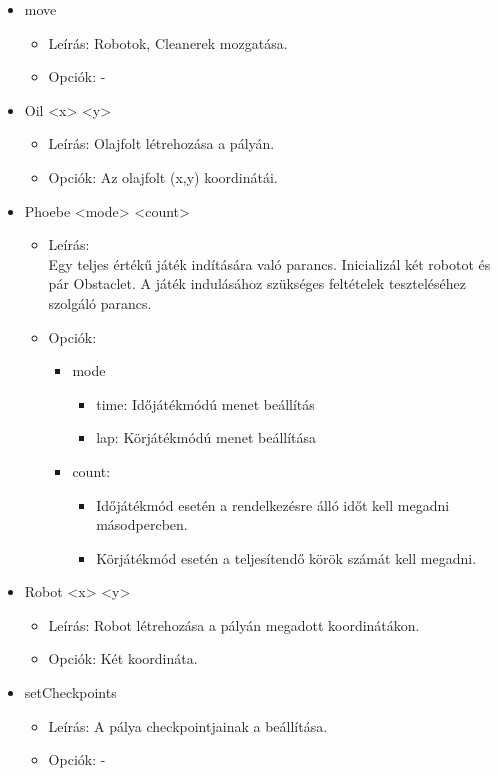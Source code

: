 \begin{itemize}
\item move
	\begin{itemize}
	\item Leírás: Robotok, Cleanerek mozgatása.
	\item Opciók: -
	\end{itemize}
	
\item Oil <x> <y>
	\begin{itemize}
	\item Leírás: Olajfolt létrehozása a pályán.
	\item Opciók: Az olajfolt (x,y) koordinátái.
	\end{itemize}

\item Phoebe <mode> <count>
	\begin{itemize}
	\item Leírás:\\ Egy teljes értékű játék indítására való parancs. Inicializál két robotot és pár Obstaclet. A játék indulásához szükséges feltételek teszteléséhez szolgáló parancs.
	\item Opciók:
		\begin{itemize}
			\item mode
			\begin{itemize}
				\item time: Időjátékmódú menet beállítás
				\item lap: Körjátékmódú menet beállítása
			\end{itemize}
			\item count: 
			\begin{itemize}
				\item Időjátékmód esetén a rendelkezésre álló időt kell megadni másodpercben.
				\item Körjátékmód esetén a teljesítendő körök számát kell megadni.
			\end{itemize}
		\end{itemize}
	\end{itemize}

\item Robot <x> <y>
    \begin{itemize}
	\item Leírás: Robot létrehozása a pályán megadott koordinátákon.
	\item Opciók: Két koordináta.
	\end{itemize}
	
\item setCheckpoints
	\begin{itemize}
	\item Leírás: A pálya checkpointjainak a beállítása.
	\item Opciók: -
	\end{itemize}
	

\end{itemize}
